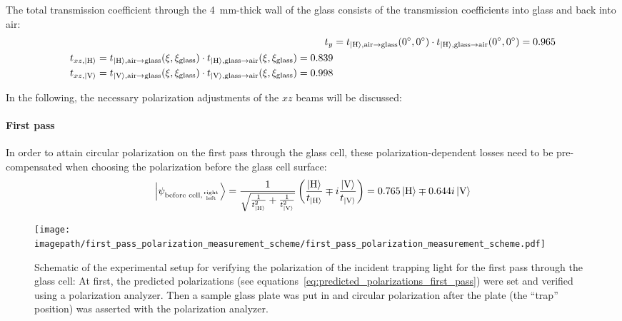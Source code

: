 The total transmission coefficient through the \SI{4}{\milli\meter}-thick wall of the glass consists of the transmission coefficients into glass and back into air:
\begin{align}
    t_{y} &= t_{\Ket{\text{H}}, \text{air} \rightarrow \text{glass}}(\SI{0}{\degree}, \SI{0}{\degree})  \cdot t_{\Ket{\text{H}}, \text{glass} \rightarrow \text{air}}(\SI{0}{\degree}, \SI{0}{\degree}) = \SI{0.965}{} \\
    \begin{split}
        t_{xz, \Ket{\text{H}}} &= t_{\Ket{\text{H}}, \text{air} \rightarrow \text{glass}}(\xi, \xi_\text{glass})  \cdot t_{\Ket{\text{H}}, \text{glass} \rightarrow \text{air}}(\xi, \xi_\text{glass}) = \SI{0.839}{} \\
        t_{xz, \Ket{\text{V}}} &= t_{\Ket{\text{V}}, \text{air} \rightarrow \text{glass}}(\xi, \xi_\text{glass})  \cdot t_{\Ket{\text{V}}, \text{glass} \rightarrow \text{air}}(\xi, \xi_\text{glass}) = \SI{0.998}{}
    \end{split}
\end{align}

In the following, the necessary polarization adjustments of the $xz$ beams will be discussed:

\paragraph{First pass}
In order to attain circular polarization on the first pass through the glass cell, these polarization-dependent losses need to be pre-compensated when choosing the polarization before the glass cell surface:
\begin{align}
    \label{eq:predicted_polarizations_first_pass}
    \Ket{\psi_{\text{before cell,} {\text{right} \atop \text{left}}}} 
    = \frac{1}{\sqrt{\frac{1}{t_{\Ket{\text{H}}}^2} + \frac{1}{t_{\Ket{\text{V}}}^2}}}
        \left(\frac{\Ket{\text{H}}}{t_{\Ket{\text{H}}}} \mp i \frac{\Ket{\text{V}}}{t_{\Ket{\text{V}}}} \right)
    = 0.765 \Ket{\text{H}} \mp 0.644i \Ket{\text{V}}
\end{align}

\begin{figure}
    \centering
    \texttt{[image: \\imagepath/first\_pass\_polarization\_measurement\_scheme/first\_pass\_polarization\_measurement\_scheme.pdf]}
    \caption{Schematic of the experimental setup for verifying the polarization of the incident trapping light for the first pass through the glass cell: At first, the predicted polarizations (see equations~\ref{eq:predicted_polarizations_first_pass}) were set and verified using a polarization analyzer. Then a sample glass plate was put in and circular polarization after the plate (the ``trap'' position) was asserted with the polarization analyzer.}
    \label{fig:first_pass_polarization_measurement_scheme}
\end{figure}

